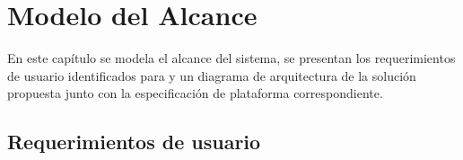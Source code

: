 \chapter{Modelo del Alcance}
\label{cap:reqUsr}

	En este capítulo se modela el alcance del sistema, se presentan  los requerimientos de usuario identificados para y un diagrama de arquitectura de la solución propuesta junto con la especificación de plataforma correspondiente.




\section{Requerimientos de usuario}




